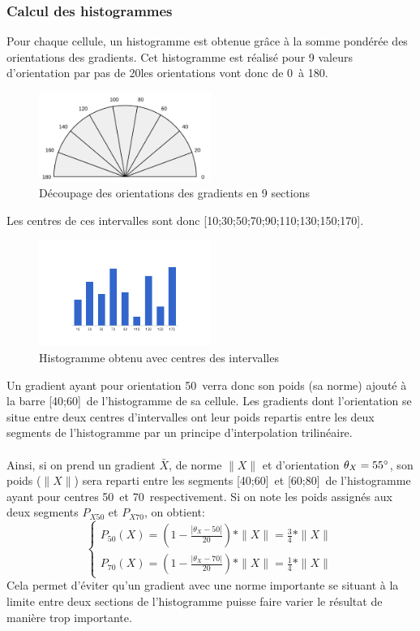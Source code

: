 \documentclass[12pt]{article}
\begin{document}
\subsubsection{Calcul des histogrammes}
Pour chaque cellule, un histogramme est obtenue grâce à la somme pondérée des orientations des gradients. Cet histogramme est réalisé pour 9 valeurs d'orientation par pas de 20\degree les orientations vont donc de 0\degree~à 180\degree.
\begin{figure}[!ht]
    \label{fig:orientations}
    \centering
	    \includegraphics[width=0.5\textwidth]{img/angles.png}
	    \caption{Découpage des orientations des gradients en 9 sections}
\end{figure}
Les centres de ces intervalles sont donc [10;30;50;70;90;110;130;150;170]\degree.
\begin{figure}[!ht]
    \label{fig:histo}
    \centering
	    \includegraphics[width=0.5\textwidth]{img/histo.png}
	    \caption{Histogramme obtenu avec centres des intervalles}
\end{figure}
Un gradient ayant pour orientation 50\degree~verra donc son poids (sa norme) ajouté à la barre [40;60]\degree~de l'histogramme de sa cellule.
Les gradients dont l'orientation se situe entre deux centres d'intervalles ont leur poids repartis entre les deux segments de l'histogramme par un principe d'interpolation trilinéaire.\\
\\
Ainsi, si on prend un gradient $\bar{X}$, de norme $\|X\|$ et d'orientation $\theta_{X}=55\degree$, son poids ($\|X\|$) sera reparti entre les segments [40;60]\degree~et [60;80]\degree~de l'histogramme ayant pour centres 50\degree~et 70\degree~respectivement.
Si on note les poids assignés aux deux segments $P_{X50}$ et $P_{X70}$, on obtient:
\[
\begin{cases}
P_{50}(X)=\left ( 1-\frac{|\theta_{X}-50|}{20} \right )*\|X\| = \frac{3}{4}*\|X\|\\
P_{70}(X)=\left ( 1-\frac{|\theta_{X}-70|}{20} \right )*\|X\| = \frac{1}{4}*\|X\|
\end{cases}
\]
Cela permet d'éviter qu'un gradient avec une norme importante se situant à la limite entre deux sections de l'histogramme puisse faire varier le résultat de manière trop importante.
\end{document}

